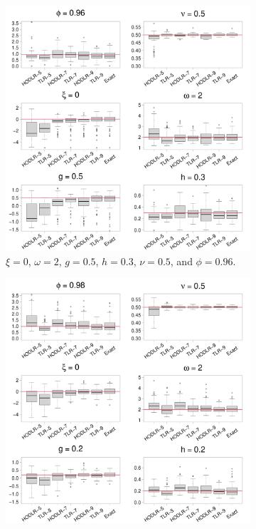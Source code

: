 \documentclass[conference]{IEEEtran}
\begin{document}
\begin{figure}[htp!]
\centering
\begin{subfigure}{0.45\textwidth}%
  \centering
  \includegraphics[width=\linewidth]{./figures/boxplot_0.960000_0.500000_0.300000.pdf}
  \caption{$\xi = 0$, $\omega = 2$, $g = 0.5$, $h = 0.3$, $\nu = 0.5$, and $\phi = 0.96$.}
\end{subfigure}%
\hspace{4mm}
\begin{subfigure}{0.45\textwidth}%
  \centering
  \includegraphics[width=\linewidth]{./figures/boxplot_0.980000_0.200000_0.200000.pdf}

\end{subfigure}
\end{figure}
\end{document}

